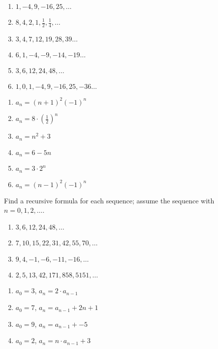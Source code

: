 \begin{questions}
\begin{minipage}{0.5\textwidth}
\begin{enumerate}[label=(\alph*),itemsep=0pt,parsep=0pt,topsep=0pt]
  \item $1, -4, 9, -16, 25, \ldots$ 
  \item $8, 4, 2, 1, \frac{1}{2}, \frac{1}{4},  \ldots$
  \item $3, 4, 7, 12, 19, 28, 39 \ldots$
  \item $6, 1, -4, -9, -14, -19 \ldots$ 
  \item $3, 6, 12, 24, 48, \ldots$
  \item $1, 0, 1, -4, 9, -16, 25, -36 \ldots$
\end{enumerate}
\end{minipage}
% 
\begin{minipage}{0.5\textwidth}
\begin{solution}
\begin{enumerate}[label=(\alph*),itemsep=0pt,parsep=0pt,topsep=0pt]
  \item $a_n = (n+1)^2 (-1)^n$ 
  \item $a_n = 8\cdot (\frac{1}{2})^n$ 
  \item $a_n = n^2 + 3$
  \item $a_n = 6 - 5n$
  \item $a_n = 3\cdot 2^n$ 
  \item $a_n = (n-1)^2 (-1)^n$
\end{enumerate}
\end{solution}
\end{minipage}



 Find a recursive formula for each sequence; assume the sequence with $n=0, 1, 2, \ldots$.

\begin{minipage}{0.5\textwidth}
\begin{enumerate}[label=(\alph*),itemsep=0pt,parsep=0pt,topsep=0pt]
  \item $3, 6, 12, 24, 48, \ldots$  
  \item $7, 10, 15, 22, 31, 42, 55, 70, \ldots$\
  \item $9, 4, -1, -6, -11, -16, \ldots$
  \item $2, 5, 13, 42, 171, 858, 5151, \ldots$
\end{enumerate}
\end{minipage}
% 
\begin{minipage}{0.5\textwidth}
\begin{solution}
\begin{enumerate}[label=(\alph*),itemsep=0pt,parsep=0pt,topsep=0pt]
  \item $a_0 = 3$, $a_n = 2\cdot a_{n-1}$
  \item $a_0 = 7$, $a_n = a_{n-1} + 2n + 1$ 
  \item $a_0 = 9$, $a_n = a_{n-1} + -5$
  \item $a_0 = 2$, $a_n = n\cdot a_{n-1} + 3$
\end{enumerate}
\end{solution}
\end{minipage}




\end{questions}
